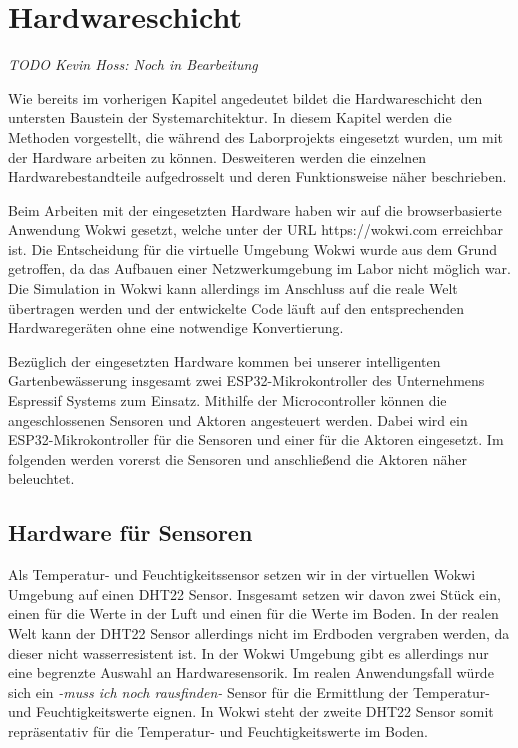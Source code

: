 
\section{Hardwareschicht}
\textit{TODO Kevin Hoss: Noch in Bearbeitung}

Wie bereits im vorherigen Kapitel angedeutet bildet die Hardwareschicht den untersten Baustein der Systemarchitektur. In diesem Kapitel werden die Methoden vorgestellt, die während des Laborprojekts eingesetzt wurden, um mit der Hardware arbeiten zu können. Desweiteren werden die einzelnen Hardwarebestandteile aufgedrosselt und deren Funktionsweise näher beschrieben.

Beim Arbeiten mit der eingesetzten Hardware haben wir auf die browserbasierte Anwendung Wokwi gesetzt, welche unter der URL https://wokwi.com erreichbar ist. Die Entscheidung für die virtuelle Umgebung Wokwi wurde aus dem Grund getroffen, da das Aufbauen einer Netzwerkumgebung im Labor nicht möglich war. Die Simulation in Wokwi kann allerdings im Anschluss auf die reale Welt übertragen werden und der entwickelte Code läuft auf den entsprechenden Hardwaregeräten ohne eine notwendige Konvertierung.

Bezüglich der eingesetzten Hardware kommen bei unserer intelligenten Gartenbewässerung insgesamt zwei ESP32-Mikrokontroller des Unternehmens Espressif Systems zum Einsatz. Mithilfe der Microcontroller können die angeschlossenen Sensoren und Aktoren angesteuert werden. Dabei wird ein ESP32-Mikrokontroller für die Sensoren und einer für die Aktoren eingesetzt. Im folgenden werden vorerst die Sensoren und anschließend die Aktoren näher beleuchtet.

\subsection{Hardware für Sensoren}
Als Temperatur- und Feuchtigkeitssensor setzen wir in der virtuellen Wokwi Umgebung auf einen DHT22 Sensor. Insgesamt setzen wir davon zwei Stück ein, einen für die Werte in der Luft und einen für die Werte im Boden. In der realen Welt kann der DHT22 Sensor allerdings nicht im Erdboden vergraben werden, da dieser nicht wasserresistent ist. In der Wokwi Umgebung gibt es allerdings nur eine begrenzte Auswahl an Hardwaresensorik. Im realen Anwendungsfall würde sich ein \textit{-muss ich noch rausfinden-} Sensor für die Ermittlung der Temperatur- und Feuchtigkeitswerte eignen. In Wokwi steht der zweite DHT22 Sensor somit repräsentativ für die Temperatur- und Feuchtigkeitswerte im Boden.

